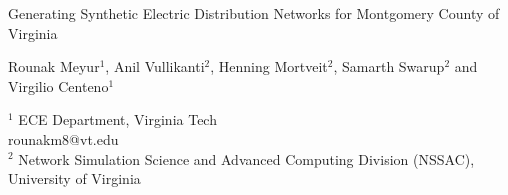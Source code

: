 \documentclass[a4paper]{article}
\begin{document}

\Large
 \begin{center}
Generating Synthetic Electric Distribution Networks for Montgomery County of Virginia\\ 

\hspace{10pt}

\large
Rounak Meyur$^1$, Anil Vullikanti$^2$, Henning Mortveit$^2$, Samarth Swarup$^2$ and Virgilio Centeno$^1$ \\

\hspace{10pt}

\small  
$^1$ ECE Department, Virginia Tech\\
rounakm8@vt.edu\\
$^2$ Network Simulation Science and Advanced Computing  Division (NSSAC), University of Virginia

\end{center}

\hspace{10pt}
\end{document}
